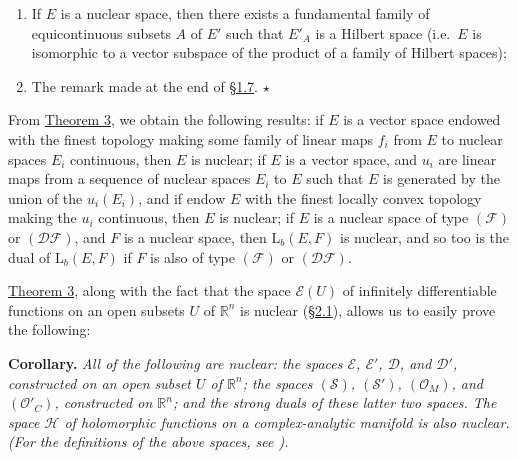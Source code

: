 \documentclass[british]{article}
\providecommand{\tightlist}{%
\setlength{\itemsep}{0pt}\setlength{\parskip}{0pt}}
\newenvironment{itenv}[1]
  {\phantomsection\par\smallskip\noindent\textbf{#1.}\itshape}
  {\par\smallskip}
\newcommand{\oldpage}[1]{\marginpar{\footnotesize$\Big\vert$ \textit{p.~#1}}}
\begin{document}
\begin{enumerate}
\def\labelenumi{\arabic{enumi}.}
\tightlist
\item
  If \(E\) is a nuclear space, then there exists a fundamental family of
  equicontinuous subsets \(A\) of \(E'\) such that \(E'_A\) is a Hilbert
  space (i.e.~\(E\) is isomorphic to a vector subspace of the product of
  a family of Hilbert spaces);
\item
  The remark made at the end of \hyperref[section-1.7]{§1.7}. \(\star\)
\end{enumerate}

From \hyperref[section-2-theorem-3]{Theorem 3}, we obtain the following
results: if \(E\) is a vector space endowed with the finest topology
making some family of linear maps \(f_i\) from \(E\) to nuclear spaces
\(E_i\) continuous, then \(E\) is nuclear; if \(E\) is a vector space,
and \(u_i\) are linear maps from a sequence of nuclear spaces \(E_i\) to
\(E\) such that \(E\) is generated by the union of the \(u_i(E_i)\), and
if endow \(E\) with the finest locally convex topology making the
\(u_i\) continuous, then \(E\) is nuclear; if \(E\) is a nuclear space
of type \((\mathscr{F})\) or \((\mathscr{DF})\), and \(F\) is a nuclear
space, then \(\mathrm{L}_b(E,F)\) is nuclear, and so too is the dual of
\(\mathrm{L}_b(E,F)\) if \(F\) is also of type \((\mathscr{F})\) or
\((\mathscr{DF})\).

\hyperref[section-2-theorem-3]{Theorem 3}, along with the fact that the
space \(\mathscr{E}(U)\) of infinitely differentiable functions on an
open subsets \(U\) of \(\mathbb{R}^n\) is nuclear
(\hyperref[section-2.1]{§2.1}), allows us to easily prove the following:

\begin{itenv}{Corollary}
All of the following are nuclear: the spaces \(\mathscr{E}\),
\(\mathscr{E}'\), \(\mathscr{D}\), and \(\mathscr{D}'\), constructed on
an open subset \(U\) of \(\mathbb{R}^n\); the spaces \((\mathscr{S})\),
\((\mathscr{S}')\), \((\mathscr{O}_M)\), and \((\mathscr{O}'_C)\),
constructed on \(\mathbb{R}^n\); and the strong duals of these latter
two spaces. The space \(\mathscr{H}\) of holomorphic functions on a
complex-analytic manifold is also nuclear. (For the definitions of the
above spaces, see \autocite{9}).

\end{itenv}

\oldpage{103}
\end{document}

